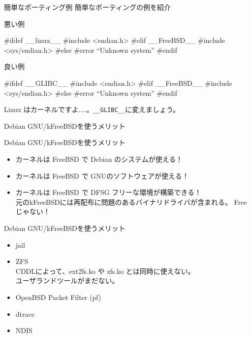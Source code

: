 \begin{frame}[containsverbatim]{簡単なポーティング例}
簡単なポーティングの例を紹介\\
\begin{minipage}[t]{0.45\hsize}
悪い例
\begin{commandline}
#ifdef __linux__
#include <endian.h>
#elif __FreeBSD__
#include <sys/endian.h>
#else
#error ``Unknown system''
#endif
\end{commandline}
\end{minipage}
\begin{minipage}[t]{0.45\hsize}
良い例
\begin{commandline}
#ifdef __GLIBC__
#include <endian.h>
#elif __FreeBSD__
#include <sys/endian.h>
#else
#error ``Unknown system''
#endif
\end{commandline}
\end{minipage}

Linux はカーネルですよ....。\texttt{\_\_GLIBC\_\_}に変えましょう。
\end{frame}

\begin{frame}{Debian GNU/kFreeBSDを使うメリット}

\end{frame}

\begin{frame}{Debian GNU/kFreeBSDを使うメリット}
\begin{itemize}
\item<1-> カーネルは FreeBSD で Debian のシステムが使える！
\item<2-> カーネルは FreeBSD で GNUのソフトウェアが使える！
\item<3-> カーネルは FreeBSD で DFSG フリーな環境が構築できる！\\
元のkFreeBSDには再配布に問題のあるバイナリドライバが含まれる。
Freeじゃない！ 
\end{itemize}
\end{frame}

\begin{frame}{Debian GNU/kFreeBSDを使うメリット}
\begin{itemize}
\item jail 
\item ZFS\\
CDDLによって、ext2fs.ko や zfs.ko とは同時に使えない。\\
ユーザランドツールがまだない。\\
\item OpenBSD Packet Filter (pf)
\item dtrace 
\item NDIS
\end{itemize}
\end{frame}

